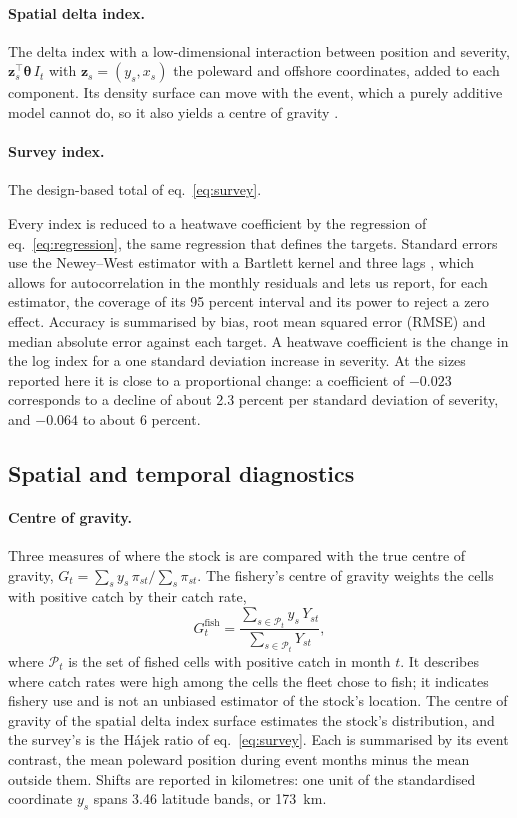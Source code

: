 \documentclass[11pt,a4paper]{article}
\newcommand{\vt}[1]{\text{#1}}
\begin{document}
\paragraph{Spatial delta index.} The delta index with a low-dimensional interaction between position and severity, $\mathbf{z}_s^{\top}\boldsymbol{\theta}\,I_t$ with $\mathbf{z}_s = (y_s, x_s)$ the poleward and offshore coordinates, added to each component. Its density surface can move with the event, which a purely additive model cannot do, so it also yields a centre of gravity \citep{thorson2016a}.

\paragraph{Survey index.} The design-based total of eq.~\eqref{eq:survey}.

Every index is reduced to a heatwave coefficient by the regression of eq.~\eqref{eq:regression}, the same regression that defines the targets. Standard errors use the Newey--West estimator with a Bartlett kernel and three lags \citep{newey1987}, which allows for autocorrelation in the monthly residuals and lets us report, for each estimator, the coverage of its 95 percent interval and its power to reject a zero effect. Accuracy is summarised by bias, root mean squared error (RMSE) and median absolute error against each target. A heatwave coefficient is the change in the log index for a one standard deviation increase in severity. At the sizes reported here it is close to a proportional change: a coefficient of $-0.023$ corresponds to a decline of about 2.3 percent per standard deviation of severity, and $-0.064$ to about 6 percent.

\subsection{Spatial and temporal diagnostics}
\label{sec:diagnostics}

\paragraph{Centre of gravity.} Three measures of where the stock is are compared with the true centre of gravity, $G_t = \sum_s y_s\,\pi_{st}\big/\sum_s\pi_{st}$. The fishery's centre of gravity weights the cells with positive catch by their catch rate,
\begin{equation}
G^{\vt{fish}}_t = \frac{\sum_{s\in\mathcal{P}_t} y_s\,Y_{st}}{\sum_{s\in\mathcal{P}_t} Y_{st}},
\label{eq:cog}
\end{equation}
where $\mathcal{P}_t$ is the set of fished cells with positive catch in month $t$. It describes where catch rates were high among the cells the fleet chose to fish; it indicates fishery use and is not an unbiased estimator of the stock's location. The centre of gravity of the spatial delta index surface estimates the stock's distribution, and the survey's is the Hájek ratio of eq.~\eqref{eq:survey}. Each is summarised by its event contrast, the mean poleward position during event months minus the mean outside them. Shifts are reported in kilometres: one unit of the standardised coordinate $y_s$ spans 3.46 latitude bands, or 173~km.
\end{document}
